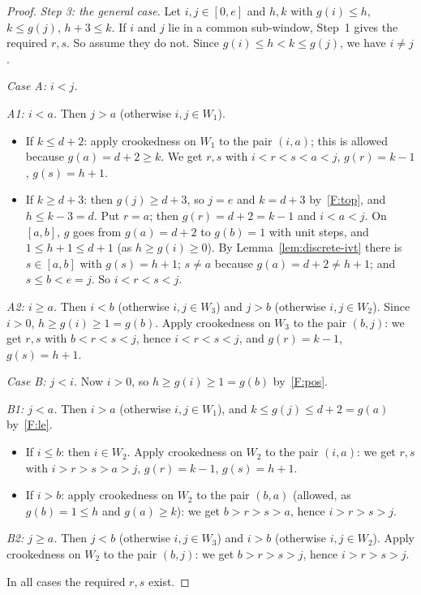 \begin{proof}
\emph{Step 3: the general case.} Let $i,j\in[0,e]$ and $h,k$ with $g(i)\le h$, $k\le g(j)$,
$h+3\le k$. If $i$ and $j$ lie in a common sub-window, Step~1 gives the required $r,s$. So
assume they do not. Since $g(i)\le h<k\le g(j)$, we have $i\neq j$.

\smallskip\noindent\emph{Case A: $i<j$.}

\emph{A1: $i<a$.} Then $j>a$ (otherwise $i,j\in W_1$).
\begin{itemize}
\item If $k\le d+2$: apply crookedness on $W_1$ to the pair $(i,a)$; this is allowed because
$g(a)=d+2\ge k$. We get $r,s$ with $i<r<s<a<j$, $g(r)=k-1$, $g(s)=h+1$.
\item If $k\ge d+3$: then $g(j)\ge d+3$, so $j=e$ and $k=d+3$ by~\ref{F:top}, and $h\le k-3=d$.
Put $r=a$; then $g(r)=d+2=k-1$ and $i<a<j$. On $[a,b]$, $g$ goes from $g(a)=d+2$ to $g(b)=1$ with
unit steps, and $1\le h+1\le d+1$ (as $h\ge g(i)\ge0$). By Lemma~\ref{lem:discrete-ivt} there is
$s\in[a,b]$ with $g(s)=h+1$; $s\ne a$ because $g(a)=d+2\ne h+1$; and $s\le b<e=j$. So
$i<r<s<j$.
\end{itemize}

\emph{A2: $i\ge a$.} Then $i<b$ (otherwise $i,j\in W_3$) and $j>b$ (otherwise $i,j\in W_2$). Since
$i>0$, $h\ge g(i)\ge1=g(b)$. Apply crookedness on $W_3$ to the pair $(b,j)$: we get $r,s$ with
$b<r<s<j$, hence $i<r<s<j$, and $g(r)=k-1$, $g(s)=h+1$.

\smallskip\noindent\emph{Case B: $j<i$.} Now $i>0$, so $h\ge g(i)\ge1=g(b)$ by~\ref{F:pos}.

\emph{B1: $j<a$.} Then $i>a$ (otherwise $i,j\in W_1$), and $k\le g(j)\le d+2=g(a)$
by~\ref{F:le}.
\begin{itemize}
\item If $i\le b$: then $i\in W_2$. Apply crookedness on $W_2$ to the pair $(i,a)$: we get
$r,s$ with $i>r>s>a>j$, $g(r)=k-1$, $g(s)=h+1$.
\item If $i>b$: apply crookedness on $W_2$ to the pair $(b,a)$ (allowed, as $g(b)=1\le h$ and
$g(a)\ge k$): we get $b>r>s>a$, hence $i>r>s>j$.
\end{itemize}

\emph{B2: $j\ge a$.} Then $j<b$ (otherwise $i,j\in W_3$) and $i>b$ (otherwise $i,j\in W_2$).
Apply crookedness on $W_2$ to the pair $(b,j)$: we get $b>r>s>j$, hence $i>r>s>j$.

\smallskip
In all cases the required $r,s$ exist.
\end{proof}

